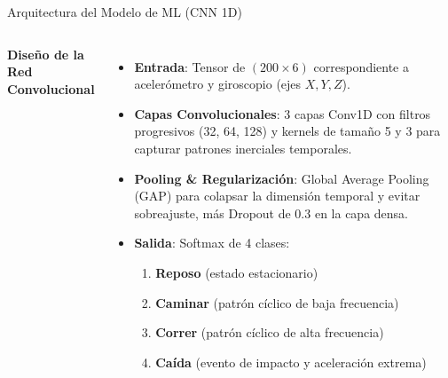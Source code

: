 \documentclass[aspectratio=169, 10pt]{beamer}
\begin{document}
\begin{frame}{Arquitectura del Modelo de ML (CNN 1D)}
    \begin{columns}[T]
        \scriptsize
        \textbf{Dise\~no de la Red Convolucional}
        \begin{itemize}\itemsep0.08cm
            \item \textbf{Entrada}: Tensor de \((200 \times 6)\) correspondiente a aceler\'ometro y giroscopio (ejes $X, Y, Z$).
            \item \textbf{Capas Convolucionales}: 3 capas Conv1D con filtros progresivos (32, 64, 128) y kernels de tama\~no 5 y 3 para capturar patrones inerciales temporales.
            \item \textbf{Pooling \& Regularizaci\'on}: Global Average Pooling (GAP) para colapsar la dimensi\'on temporal y evitar sobreajuste, m\'as Dropout de 0.3 en la capa densa.
            \item \textbf{Salida}: Softmax de 4 clases:
                \begin{enumerate}\scriptsize\itemsep0.02cm
                    \item \textbf{Reposo} (estado estacionario)
                    \item \textbf{Caminar} (patr\'on c\'iclico de baja frecuencia)
                    \item \textbf{Correr} (patr\'on c\'iclico de alta frecuencia)
                    \item \textbf{Ca\'ida} (evento de impacto y aceleraci\'on extrema)
                \end{enumerate}
        \end{itemize}
        
        \centering
\end{columns}
\end{frame}
\end{document}
